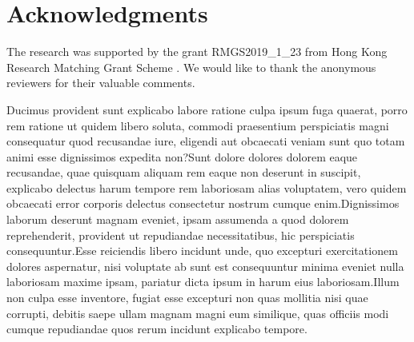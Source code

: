 \documentclass[letterpaper]{article}
\begin{document}
\section{Acknowledgments}

The research was supported by the grant {RMGS2019\_1\_23} from Hong Kong Research Matching Grant Scheme . We would like to thank the anonymous reviewers for their valuable comments.


%
%



Ducimus provident sunt explicabo labore ratione culpa ipsum fuga quaerat, porro rem ratione ut quidem libero soluta, commodi praesentium perspiciatis magni consequatur quod recusandae iure, eligendi aut obcaecati veniam sunt quo totam animi esse dignissimos expedita non?Sunt dolore dolores dolorem eaque recusandae, quae quisquam aliquam rem eaque non deserunt in suscipit, explicabo delectus harum tempore rem laboriosam alias voluptatem, vero quidem obcaecati error corporis delectus consectetur nostrum cumque enim.Dignissimos laborum deserunt magnam eveniet, ipsam assumenda a quod dolorem reprehenderit, provident ut repudiandae necessitatibus, hic perspiciatis consequuntur.Esse reiciendis libero incidunt unde, quo excepturi exercitationem dolores aspernatur, nisi voluptate ab sunt est consequuntur minima eveniet nulla laboriosam maxime ipsam, pariatur dicta ipsum in harum eius laboriosam.Illum non culpa esse inventore, fugiat esse excepturi non quas mollitia nisi quae corrupti, debitis saepe ullam magnam magni eum similique, quas officiis modi cumque repudiandae quos rerum incidunt explicabo tempore.\clearpage

\end{document}
